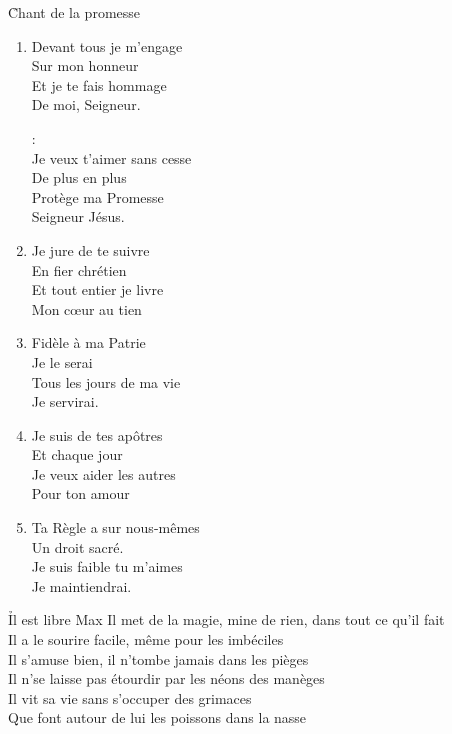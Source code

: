 \documentclass{novel}
\begin{document}
{{\begin{minipage}[b][0.55\textheight][t]{\textwidth}
\h*{Chant de la promesse}
\begin{multicols}{2}
\begin{enumerate}
\item Devant tous je m'engage\\
Sur mon honneur\\
Et je te fais hommage\\
De moi, Seigneur.\\

\begin{bfseries}
[Refrain]:\\
Je veux t'aimer sans cesse\\
De plus en plus\\
Protège ma Promesse\\
Seigneur Jésus.\\
\end{bfseries}

\item Je jure de te suivre\\
En fier chrétien\\
Et tout entier je livre\\
Mon cœur au tien\\

\item Fidèle à ma Patrie\\
Je le serai\\
Tous les jours de ma vie\\
Je servirai.\\


\item Je suis de tes apôtres\\
Et chaque jour\\
Je veux aider les autres\\
Pour ton amour\\

\item Ta Règle a sur nous-mêmes\\
Un droit sacré.\\
Je suis faible tu m'aimes\\
Je maintiendrai.\\
\end{enumerate}
\end{multicols}
    \end{minipage}
}
}
\newpage

\h*{Il est libre Max}
Il met de la magie, mine de rien, dans tout ce qu'il fait\\
Il a le sourire facile, même pour les imbéciles\\
Il s'amuse bien, il n'tombe jamais dans les pièges\\
Il n'se laisse pas étourdir par les néons des manèges\\
Il vit sa vie sans s'occuper des grimaces\\
Que font autour de lui les poissons dans la nasse\\
\end{document}
